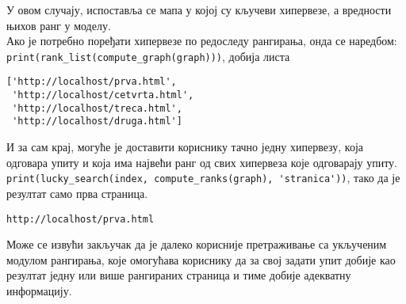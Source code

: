 У овом случају, испоставља се мапа у којој су кључеви хипервезе, а вредности њихов ранг у моделу.\\
Ако је потребно поређати хипервезе по редоследу рангирања, онда се наредбом:\\
\lstinline{print(rank_list(compute_graph(graph)))}, добија листа\\
\begin{lstlisting}
['http://localhost/prva.html',
 'http://localhost/cetvrta.html',
 'http://localhost/treca.html',
 'http://localhost/druga.html']
\end{lstlisting}
И за сам крај, могуће је доставити кориснику тачно једну хипервезу, која одговара упиту и која има највећи ранг од свих хипервеза које одговарају упиту.\\
\lstinline{print(lucky_search(index, compute_ranks(graph), 'stranica'))}, тако да је резултат само прва страница.
\begin{lstlisting}
http://localhost/prva.html
\end{lstlisting}

Може се извући закључак да је далеко корисније претраживање са укљученим модулом рангирања, које омогућава кориснику да за свој задати упит добије као резултат једну или више рангираних страница и тиме добије адекватну информацију.